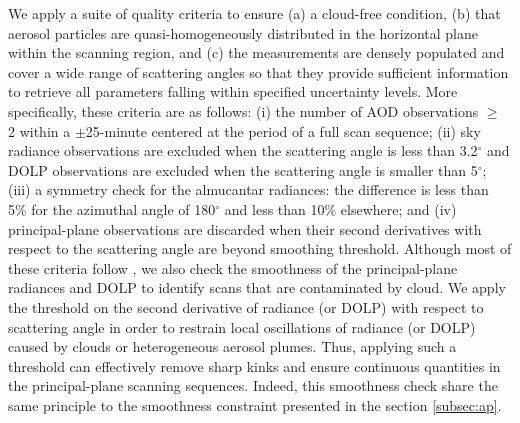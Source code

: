 We apply a suite of quality criteria to ensure (a) a cloud-free condition,
(b) that aerosol particles are quasi-homogeneously distributed in the
horizontal plane within the scanning region, and (c) the measurements
are densely populated and cover a wide range of scattering angles so
that they provide sufficient information to retrieve all parameters
falling within specified uncertainty levels. More specifically, these
criteria are as follows: (i) the number of AOD observations $\geq$ 2 within a 
$\pm$25-minute centered at the period of a full scan sequence; (ii) sky
radiance observations are excluded when the scattering angle is less
than 3.2$^\circ$ and DOLP observations are excluded when the scattering angle
is smaller than 5$^\circ$; (iii) a symmetry check for the almucantar radiances: the
difference is less than 5\% for the azimuthal angle of 180$^\circ$ and less than
10\% elsewhere; and (iv) principal-plane observations are discarded when
their second derivatives with respect to the scattering angle are beyond
smoothing threshold. Although most of these criteria follow
\citet{Holben06}, we also check the smoothness of the principal-plane
radiances and DOLP to identify scans that are contaminated by cloud. We
apply the threshold on the second derivative of radiance (or DOLP) with
respect to scattering angle in order to restrain local oscillations of
radiance (or DOLP) caused by clouds or heterogeneous aerosol plumes.
Thus, applying such a threshold can effectively remove sharp kinks and
ensure continuous quantities in the principal-plane scanning sequences. 
Indeed, this smoothness check share the same principle to the smoothness 
constraint presented in the section \ref{subsec:ap}. 

